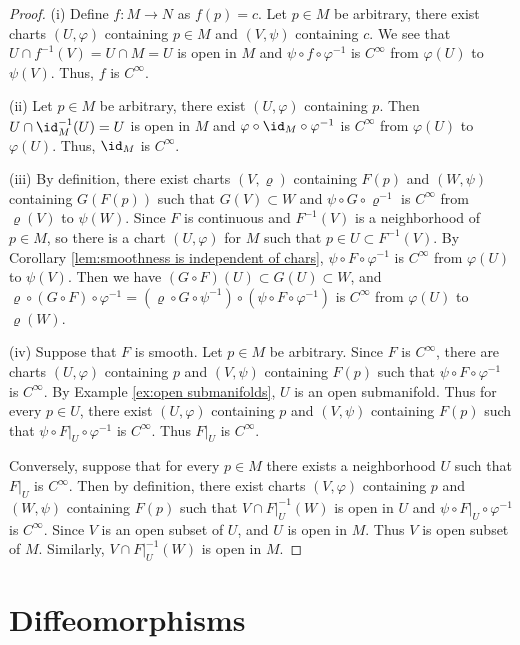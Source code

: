 \begin{proof}
    (i) Define $f : M \to N$ as $f(p) = c$. Let $p \in M$ be arbitrary, there exist charts $(U, \varphi)$ containing $p \in M$ and $(V, \psi)$ containing $c$. We see that $U \cap f^{-1}(V) = U \cap M = U$ is open in $M$ and $\psi \circ f \circ\varphi^{-1}$ is $C^\infty$ from $\varphi(U)$ to $\psi(V)$. Thus, $f$ is $C^\infty$.

    (ii) Let $p \in M$ be arbitrary, there exist $(U, \varphi)$ containing $p$. Then $U \cap \id_M^{-1}(U) = U$ is open in $M$ and $\varphi \circ \id_M \circ \varphi^{-1}$ is $C^\infty$ from $\varphi(U)$ to $\varphi(U)$. Thus, $\id_M$ is $C^\infty$.

    (iii) By definition, there exist charts $(V, \varrho)$ containing $F(p)$ and $(W, \psi)$ containing $G(F(p))$ such that $G(V) \subset W$ and $\psi \circ G \circ \varrho^{-1}$ is $C^\infty$ from $\varrho(V)$ to $\psi(W)$. Since $F$ is continuous and $F^{-1}(V)$ is a neighborhood of $p \in M$, so there is a chart $(U, \varphi)$ for $M$ such that $p \in U \subset F^{-1}(V)$. By Corollary \ref{lem:smoothness is independent of chars}, $\psi \circ F \circ \varphi^{-1}$ is $C^\infty$ from $\varphi(U)$ to $\psi(V)$. Then we have $(G \circ F)(U) \subset G(U) \subset W$, and $\varrho \circ (G \circ F) \circ \varphi^{-1} = (\varrho \circ G \circ \psi^{-1}) \circ (\psi \circ F \circ \varphi^{-1})$ is $C^\infty$ from $\varphi(U)$ to $\varrho(W)$.

    (iv) Suppose that $F$ is smooth. Let $p \in M$ be arbitrary. Since $F$ is $C^\infty$, there are charts $(U, \varphi)$ containing $p$ and $(V, \psi)$ containing $F(p)$ such that $\psi \circ F \circ \varphi^{-1}$ is $C^\infty$. By Example \ref{ex:open submanifolds}, $U$ is an open submanifold. Thus for every $p \in U$, there exist $(U, \varphi)$ containing $p$ and $(V, \psi)$ containing $F(p)$ such that $\psi \circ F|_U \circ \varphi^{-1}$ is $C^\infty$. Thus $F|_U$ is $C^\infty$.

    Conversely, suppose that for every $p \in M$ there exists a neighborhood $U$ such that $F|_U$ is $C^\infty$. Then by definition, there exist charts $(V, \varphi)$ containing $p$ and $(W, \psi)$ containing $F(p)$ such that $V \cap F|_U^{-1}(W)$ is open in $U$ and $\psi \circ F|_U \circ \varphi^{-1}$ is $C^\infty$. Since $V$ is an open subset of $U$, and $U$ is open in $M$. Thus $V$ is open subset of $M$. Similarly, $V \cap F|_U^{-1}(W)$ is open in $M$.
\end{proof}

\section{Diffeomorphisms}


